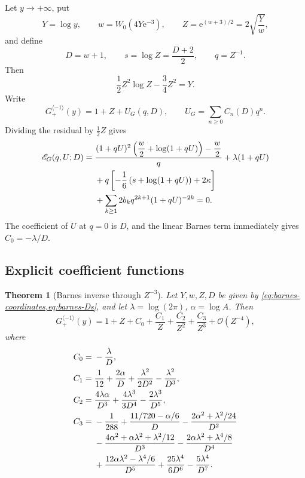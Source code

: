\documentclass[11pt,a4paper]{article}
\numberwithin{equation}{section}
\newtheorem{theorem}{Theorem}[section]
\theoremstyle{definition}
\theoremstyle{remark}
\newcommand{\e}{\mathrm e}
\newcommand{\Ord}{\mathcal O}
\newcommand{\cinv}{\langle-1\rangle}
\newcommand{\BarnesInv}{G_{+}^{\cinv}}
\begin{document}
Let \(y\to+\infty\), put
\begin{equation}
 Y=\log y,
 \qquad
 w=W_0(4Y\e^{-3}),
 \qquad
 Z=\e^{(w+3)/2}=2\sqrt{\frac{Y}{w}},
 \label{eq:barnes-coordinates}
\end{equation}
and define
\begin{equation}
 D=w+1,
 \qquad s=\log Z=\frac{D+2}{2},
 \qquad q=Z^{-1}.
 \label{eq:barnes-Ds}
\end{equation}
Then
\begin{equation}
 \frac12Z^2\log Z-\frac34Z^2=Y.
 \label{eq:barnes-leading-exact}
\end{equation}
Write
\begin{equation}
 G_+^{\cinv}(y)=1+Z+U_G(q,D),
 \qquad U_G=\sum_{n\ge0}C_n(D)q^n.
 \label{eq:barnes-U-def}
\end{equation}
Dividing the residual by \(\tfrac12Z\) gives
\begin{align}
 \mathscr E_G(q,U;D)={}&
 \frac{(1+qU)^2\left(\dfrac w2+\log(1+qU)\right)-\dfrac w2}{q}
 +\lambda(1+qU)
 \notag\\
 &+q\left[-\frac16\left(s+\log(1+qU)\right)+2\kappa\right]
 \notag\\
 &+\sum_{k\ge1}2b_kq^{2k+1}(1+qU)^{-2k}=0.
 \label{eq:E-barnes}
\end{align}
The coefficient of \(U\) at \(q=0\) is \(D\), and the linear Barnes term
immediately gives \(C_0=-\lambda/D\).

\subsection{Explicit coefficient functions}

\begin{theorem}[Barnes inverse through \(Z^{-3}\)]\label{thm:barnes-main}
Let \(Y,w,Z,D\) be given by
\cref{eq:barnes-coordinates,eq:barnes-Ds}, and let
\(\lambda=\log(2\pi)\), \(\alpha=\log A\).  Then
\begin{equation}
 \BarnesInv(y)=1+Z+C_0+\frac{C_1}{Z}+\frac{C_2}{Z^2}
 +\frac{C_3}{Z^3}+\Ord(Z^{-4}),
 \label{eq:barnes-main-series}
\end{equation}
where
\begin{align}
 C_0={}&-\frac{\lambda}{D},
 \label{eq:barnes-C0}\\
 C_1={}&\frac1{12}+\frac{2\alpha}{D}
 +\frac{\lambda^2}{2D^2}-\frac{\lambda^2}{D^3},
 \label{eq:barnes-C1}\\
 C_2={}&\frac{4\lambda\alpha}{D^3}
 +\frac{4\lambda^3}{3D^4}-\frac{2\lambda^3}{D^5},
 \label{eq:barnes-C2}\\
 C_3={}&-\frac1{288}
 +\frac{11/720-\alpha/6}{D}
 -\frac{2\alpha^2+\lambda^2/24}{D^2}
 \notag\\
 &-\frac{4\alpha^2+\alpha\lambda^2+\lambda^2/12}{D^3}
 -\frac{2\alpha\lambda^2+\lambda^4/8}{D^4}
 \notag\\
 &+\frac{12\alpha\lambda^2-\lambda^4/6}{D^5}
 +\frac{25\lambda^4}{6D^6}-\frac{5\lambda^4}{D^7}.
 \label{eq:barnes-C3}
\end{align}
\end{theorem}
\end{document}
